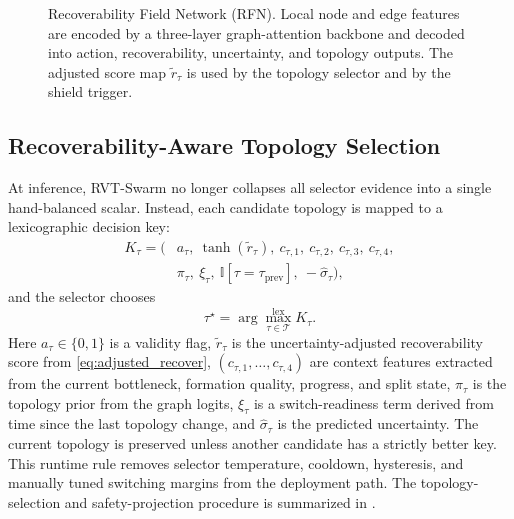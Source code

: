 \documentclass[journal]{IEEEtran}
\newcommand{\cT}{\mathcal{T}}
\begin{document}
\begin{figure}[!t]
\centering

\caption{Recoverability Field Network (RFN). Local node and edge
features are encoded by a three-layer graph-attention backbone and
decoded into action, recoverability, uncertainty, and topology outputs.
The adjusted score map $\tilde{r}_\tau$ is used by the topology selector
and by the shield trigger.}
\label{fig:rfn}
\end{figure}

\subsection{Recoverability-Aware Topology Selection}
\label{sec:selector}

At inference, RVT-Swarm no longer collapses all selector evidence into a
single hand-balanced scalar. Instead, each candidate topology is mapped
to a lexicographic decision key:
\begin{equation}
\begin{aligned}
K_\tau = (&a_\tau,\ \tanh(\tilde r_\tau),\ c_{\tau,1},\ c_{\tau,2},\ c_{\tau,3},\ c_{\tau,4}, \\
          &\pi_\tau,\ \xi_\tau,\ \mathbb{I}[\tau=\tau_{\mathrm{prev}}],\ -\hat\sigma_\tau),
\end{aligned}
\label{eq:selector_key}
\end{equation}
and the selector chooses
\begin{equation}
\tau^\star = \arg\max_{\tau \in \cT}^{\mathrm{lex}} K_\tau.
\label{eq:selector_choice}
\end{equation}
Here $a_\tau\in\{0,1\}$ is a validity flag, $\tilde r_\tau$ is the
uncertainty-adjusted recoverability score from
\eqref{eq:adjusted_recover}, $(c_{\tau,1},\dots,c_{\tau,4})$ are
context features extracted from the current bottleneck, formation
quality, progress, and split state, $\pi_\tau$ is the topology prior
from the graph logits, $\xi_\tau$ is a switch-readiness term derived
from time since the last topology change, and $\hat\sigma_\tau$ is the
predicted uncertainty. The current topology is preserved unless another
candidate has a strictly better key. This runtime rule removes selector
temperature, cooldown, hysteresis, and manually tuned switching margins
from the deployment path. The topology-selection and safety-projection
procedure is summarized in .
\end{document}
